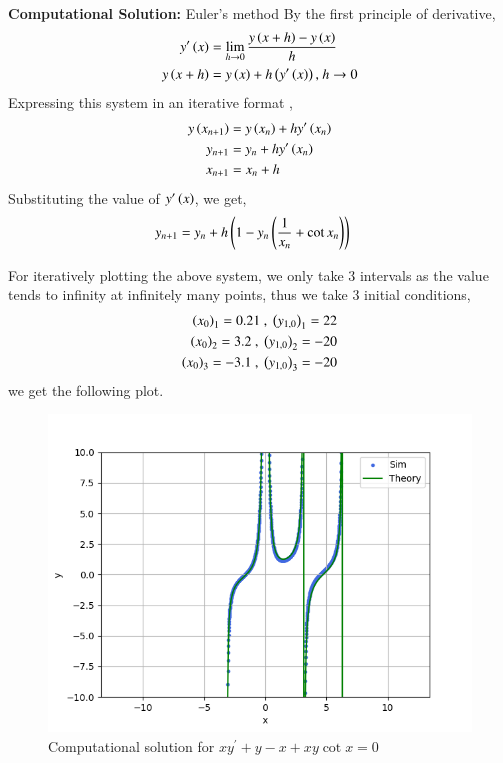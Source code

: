 \documentclass[journal]{IEEEtran}
\begin{document}
\textbf{Computational Solution:} Euler's method
\newline
By the first principle of derivative,
\begin{align}
    y^{\prime}\left(x\right) &= \lim_{h\to0} \frac{y\left(x + h\right) - y\left(x\right)}{h}\\
    y\left(x + h\right) &= y\left(x\right) + h\left(y^{\prime}\left(x\right)\right) \text{, } h\to0
\end{align}
Expressing this system in an iterative format ,
\begin{align}
    y\left(x_{n + 1}\right) &= y\left(x_n\right) + hy^{\prime}\left(x_n\right)\\
    y_{n + 1} &= y_n + hy^{\prime}\left(x_n\right)\\
    x_{n + 1} &= x_n + h
\end{align}
Substituting the value of $y^{\prime}\left(x\right)$, we get,
\begin{align}
    y_{n + 1} &= y_n + h\left(1 - y_n\left(\frac{1}{x_n} + \cot{x_n}\right)\right)
\end{align}

For iteratively plotting the above system, we only take $3$ intervals as the value tends to infinity at infinitely many points, thus we take $3$ initial conditions,
\begin{align}
    \left(x_0\right)_1 = 0.21 \text{ , } \left(y_{1, 0}\right)_1 = 22\\
    \left(x_0\right)_2 = 3.2 \text{ , } \left(y_{1, 0}\right)_2 = -20\\
    \left(x_0\right)_3 = -3.1 \text{ , } \left(y_{1, 0}\right)_3 = -20
\end{align}
we get the following plot.

\begin{figure}[h!]
   \centering
   \includegraphics[width=0.7\columnwidth]{figs/graph.png}
    \caption{Computational solution for $xy^{\prime} + y - x + xy\cot{x} = 0$}
   \label{label}
\end{figure}
\end{document}
